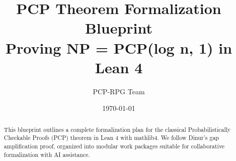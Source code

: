 \documentclass[a4paper,11pt]{report}
\title{PCP Theorem Formalization Blueprint\\
\large Proving NP = PCP(log n, 1) in Lean 4}
\author{PCP-RPG Team}
\date{\today}
\begin{document}
\maketitle

\begin{abstract}
This blueprint outlines a complete formalization plan for the classical
Probabilistically Checkable Proofs (PCP) theorem in Lean 4 with mathlib4.
We follow Dinur's gap amplification proof, organized into modular work packages
suitable for collaborative formalization with AI assistance.
\end{abstract}

\tableofcontents


\end{document}
